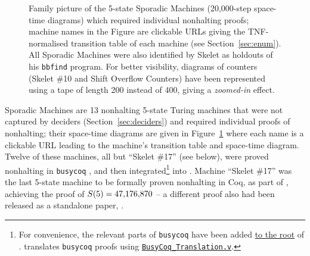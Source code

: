 \begin{figure}[h!]
    \caption{{\small Family picture of the 5-state Sporadic Machines (20,000-step space-time diagrams) which required individual \Coq nonhalting proofs; machine names in the Figure are clickable URLs giving the TNF-normalised transition table of each machine (see Section~\ref{sec:enum}). All Sporadic Machines were also identified by Skelet \cite{Skelet_bbfind} as holdouts of his \texttt{bbfind} program. For better visibility, diagrams of counters (Skelet \#10 and Shift Overflow Counters) have been represented using a tape of length 200 instead of 400, giving a \textit{zoomed-in} effect.}}
    \label{fig:sporadic}
\end{figure}

Sporadic Machines are 13 nonhalting 5-state Turing machines that were not captured by deciders (Section~\ref{sec:deciders}) and required individual \Coq proofs of nonhalting; their space-time diagrams are given in Figure~\ref{fig:sporadic} where each name is a clickable URL leading to the machine's transition table and space-time diagram. Twelve of these machines, \ie all but ``Skelet \#17'' (see below), were proved nonhalting in \texttt{busycoq} \cite{busycoq}, and then integrated\footnote{For convenience, the relevant parts of \texttt{busycoq} have been added \href{https://github.com/ccz181078/Coq-BB5/tree/main/BusyCoq}{to the root} of \CoqBB. \CoqBB translates \texttt{busycoq} proofs using \href{https://github.com/ccz181078/Coq-BB5/blob/main/CoqBB5/BB5/BusyCoq_Translation.v}{\texttt{BusyCoq\_Translation.v}}.} into \CoqBB. Machine ``Skelet \#17'' was the last 5-state machine to be formally proven nonhalting in Coq, as part of \CoqBB, achieving the proof of $S(5) = 47{,}176{,}870$ -- a different proof also had been released as a standalone paper, \cite{xu2024skelet17fifthbusy}.

